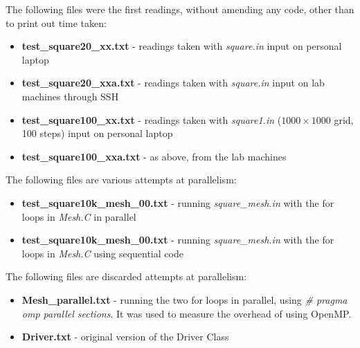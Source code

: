 \documentclass[11pt,journal]{IEEEtran}
\begin{document}
	The following files were the first readings, without amending any code, other than to print out time taken:
	
	\begin{itemize}
		\item \textbf{test\_square20\_xx.txt} - readings taken with \emph{square.in} input on personal laptop
		\item \textbf{test\_square20\_xxa.txt} - readings taken with \emph{square.in} input on lab machines through SSH	
		\item \textbf{test\_square100\_xx.txt} - readings taken with \emph{square1.in} ($1000 \times 1000$ grid, 100 steps) input on personal laptop
		\item \textbf{test\_square100\_xxa.txt} - as above, from the lab machines

	\end{itemize}

	The following files are various attempts at parallelism:
	\begin{itemize}
		\item \textbf{test\_square10k\_mesh\_00.txt} - running \emph{square\_mesh.in} with the for loops in \emph{Mesh.C} in parallel
		\item \textbf{test\_square10k\_mesh\_00.txt} - running \emph{square\_mesh.in} with the for loops in \emph{Mesh.C} using sequential code
	\end{itemize}

	The following files are discarded attempts at parallelism:
	\begin{itemize}
		\item \textbf{Mesh\_parallel.txt} - running the two for loops in parallel, using \emph{\# pragma omp parallel sections}. It was used to measure the overhead of using OpenMP.
		\item \textbf{Driver.txt} - original version of the Driver Class
	\end{itemize}



	
\end{document}
